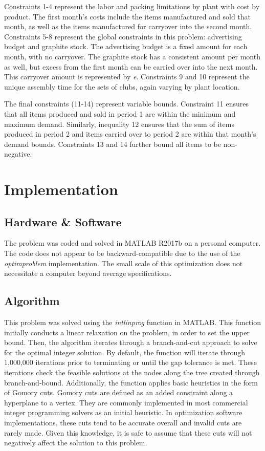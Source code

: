 \documentclass{article}
\begin{document}
Constraints 1-4 represent the labor and packing limitations by plant with cost by product.  The first month's costs include the items manufactured and sold that month, as well as the items manufactured 
for carryover into the second month.  Constraints 5-8 represent the global constraints in this problem:  advertising budget and graphite stock.  The advertising budget is a fixed amount for each month, with no carryover. The 
graphite stock has a consistent amount per month as well, but excess from the first month can be carried over into the next month.  This carryover amount is represented by \textit{e}.  Constraints 9 and 10 represent the unique assembly time 
for the sets of clubs, again varying by plant location. 
\par
The final constraints (11-14) represent variable bounds.  Constraint 11 ensures that all items produced and sold in period 1 are within the minimum and maximum demand.  Similarly, inequality 12 ensures that the sum of items produced in period 2 and items carried over to 
period 2 are within that month's demand bounds.  Constraints 13 and 14 further bound all items to be non-negative.


\section{Implementation}
\subsection{Hardware \& Software}
The problem was coded and solved in MATLAB R2017b on a personal computer.  The code does not appear to be backward-compatible due to the use of the \textit{optimproblem} implementation.  The small scale of this optimization does not necessitate a computer beyond average specifications.
\subsection{Algorithm}
This problem was solved using the \textit{intlinprog} function in MATLAB.  This function initially conducts a linear relaxation on the problem, in order to set the upper bound.  Then, the algorithm iterates through a branch-and-cut approach to solve for the optimal integer solution.  By default, the function 
will iterate through 1,000,000 iterations prior to terminating or until the gap tolerance is met.  These iterations check the feasible solutions at the nodes along the tree created through branch-and-bound.  Additionally, the function applies basic heuristics in the form of Gomory cuts.  Gomory cuts are defined as an added constraint along a hyperplane to a vertex.  They are commonly implemented in most commercial integer programming solvers as an initial heuristic.  In optimization software implementations, these cuts tend to be accurate overall and invalid cuts are rarely made.\cite{gomory}  Given this knowledge, it is safe to assume that these cuts will not negatively affect the solution to this problem.
\end{document}
